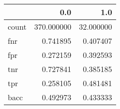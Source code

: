 \begin{tabular}{lrr}
\toprule
{} &         0.0 &        1.0 \\
\midrule
count &  370.000000 &  32.000000 \\
fnr   &    0.741895 &   0.407407 \\
fpr   &    0.272159 &   0.392593 \\
tnr   &    0.727841 &   0.385185 \\
tpr   &    0.258105 &   0.481481 \\
bacc  &    0.492973 &   0.433333 \\
\bottomrule
\end{tabular}
